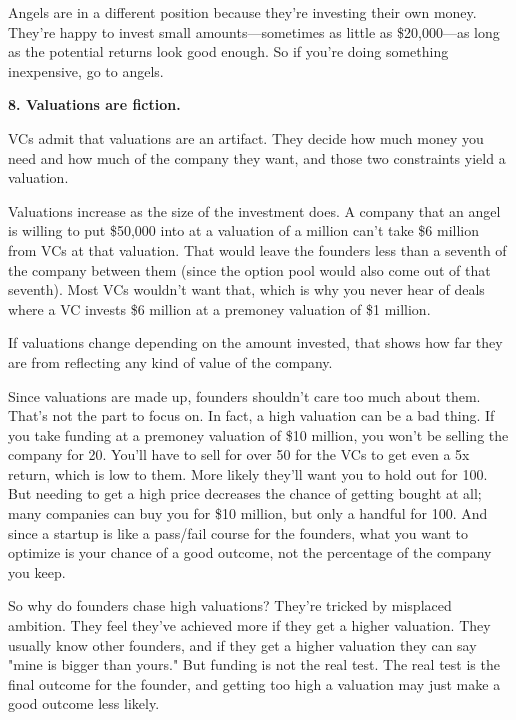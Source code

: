 Angels are in a
                  different position because they're investing their own money.
                  They're happy to invest small amounts---sometimes as
                  little as \$20,000---as long as the potential returns look
                  good enough. So if you're doing something inexpensive, go to
                  angels.

\textbf{8. Valuations are fiction.}

VCs admit that valuations are an artifact. They
                  decide how much money you need and how much of the company
                  they want, and those two constraints yield a valuation.

Valuations
                  increase as the size of the investment does. A company that an
                  angel is willing to put \$50,000 into at a valuation of a
                  million can't take \$6 million from VCs at that valuation. That
                  would leave the founders less than a seventh of the company
                  between them (since the option pool would also come out of
                  that seventh). Most VCs wouldn't want that, which is why you
                  never hear of deals where a VC invests \$6 million at a
                  premoney valuation of \$1 million.

If valuations
                  change depending on the amount invested, that shows how far
                  they are from reflecting any kind of value of the company.

Since
                  valuations are made up, founders shouldn't care too much about
                  them. That's not the part to focus on. In fact, a high
                  valuation can be a bad thing. If you take funding at a
                  premoney valuation of \$10 million, you won't be selling the
                  company for 20. You'll have to sell for over 50 for the VCs to
                  get even a 5x return, which is low to them. More likely
                  they'll want you to hold out for 100. But needing to get a
                  high price decreases the chance of getting bought at all; many
                  companies can buy you for \$10 million, but only a handful for
                  100. And since a startup is like a pass/fail course for the
                  founders, what you want to optimize is your chance of a good
                  outcome, not the percentage of the company you keep.

So
                  why do founders chase high valuations? They're tricked by
                  misplaced ambition. They feel they've achieved more if they
                  get a higher valuation. They usually know other founders, and
                  if they get a higher valuation they can say "mine is bigger
                  than yours." But funding is not the real test. The real test
                  is the final outcome for the founder, and getting too high a
                  valuation may just make a good outcome less likely.

